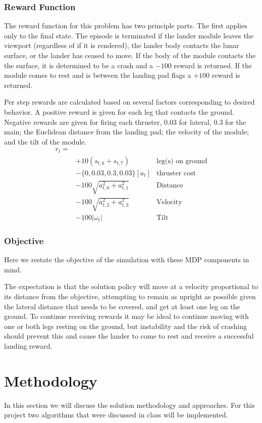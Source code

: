 \documentclass[journal]{IEEEtran}
\begin{document}
\subsubsection{Reward Function}
The reward function for this problem has two principle parts.
The first applies only to the final state. The episode is terminated 
if the lander module leaves the viewport (regardless of if it is rendered),
the lander body contacts the lunar surface, or the lander has ceased to move.
If the body of the module contacts the the surface, 
it is determined to be a crash and a \(-100\) reward is returned. 
If the module comes to rest and is between the landing pad flags a \(+100\) reward is returned.

Per step rewards are calculated based on several factors corresponding to desired behavior.
A positive reward is given for each leg that contacts the ground. Negative rewards are given
for firing each thruster, \(0.03\) for lateral, \(0.3\) for the main; the Euclidean 
distance from the landing pad; the velocity of the module; and the tilt of the module.
\begin{align*}
    r_t = \\
    & +10 (s_{t,6} + s_{t,7})   & \text{leg(s) on ground} \\
    & - \{0,0.03,0.3,0.03\}[a_t] & \text{thruster cost} \\
    & - 100\sqrt{a_{t,0}^2+a_{t,1}^2} & \text{Distance} \\
    & - 100\sqrt{a_{t,2}^2+a_{t,3}^2} & \text{Velocity} \\
    & - 100|\omega_t| & \text{Tilt}
\end{align*}

\subsubsection{Objective}
Here we restate the objective of the simulation with these MDP components in mind.

The expectation is that the solution policy will move at a velocity proportional to 
its distance from the objective, attempting to remain as upright as possible given the lateral
distance that needs to be covered, and get at least one leg on the ground.
To continue receiving rewards it may be ideal to continue moving with one or both legs resting on 
the ground, but instability and the risk of crashing should prevent this and cause the lander 
to come to rest and receive a successful landing reward.

\section{Methodology}
\label{sec:methodology}
In this section we will discuss the solution methodology and approaches.
For this project two algorithms that were discussed in class will be implemented.
\end{document}

